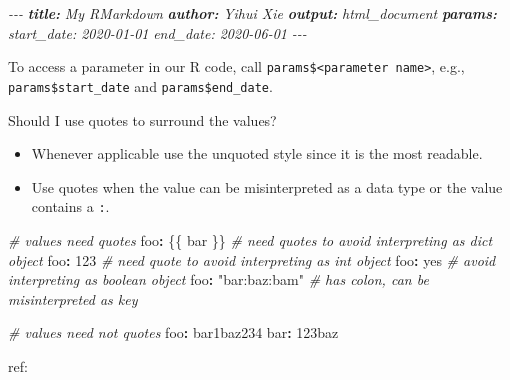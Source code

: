 \documentclass[
]{book}
\newenvironment{Shaded}{\begin{snugshade}}{\end{snugshade}}
\newcommand{\AnnotationTok}[1]{\textcolor[rgb]{0.56,0.35,0.01}{\textbf{\textit{#1}}}}
\newcommand{\CommentTok}[1]{\textcolor[rgb]{0.56,0.35,0.01}{\textit{#1}}}
\newcommand{\DecValTok}[1]{\textcolor[rgb]{0.00,0.00,0.81}{#1}}
\newcommand{\NormalTok}[1]{#1}
\newcommand{\SpecialCharTok}[1]{\textcolor[rgb]{0.81,0.36,0.00}{\textbf{#1}}}
\newcommand{\StringTok}[1]{\textcolor[rgb]{0.31,0.60,0.02}{#1}}
\providecommand{\tightlist}{%
  \setlength{\itemsep}{0pt}\setlength{\parskip}{0pt}}
\theoremstyle{definition}
\theoremstyle{definition}
\theoremstyle{definition}
\theoremstyle{definition}
\theoremstyle{remark}
\begin{document}
\begin{Shaded}
\begin{Highlighting}[]
\CommentTok{{-}{-}{-}}
\AnnotationTok{title:}\CommentTok{ My RMarkdown}
\AnnotationTok{author:}\CommentTok{ Yihui Xie}
\AnnotationTok{output:}\CommentTok{ html\_document}
\AnnotationTok{params:}
\CommentTok{  start\_date: \textquotesingle{}2020{-}01{-}01\textquotesingle{}}
\CommentTok{  end\_date: \textquotesingle{}2020{-}06{-}01\textquotesingle{}}
\CommentTok{{-}{-}{-}}
\end{Highlighting}
\end{Shaded}

To access a parameter in our R code, call \texttt{params\$\textless{}parameter\ name\textgreater{}}, e.g., \texttt{params\$start\_date} and \texttt{params\$end\_date}.

Should I use quotes to surround the values?

\begin{itemize}
\tightlist
\item
  Whenever applicable use the unquoted style since it is the most readable.
\item
  Use quotes when the value can be misinterpreted as a data type or the value contains a \texttt{:}.
\end{itemize}

\begin{Shaded}
\begin{Highlighting}[]
\CommentTok{\# values need quotes}
\NormalTok{foo}\SpecialCharTok{:} \StringTok{\textquotesingle{}\{\{ bar \}\}\textquotesingle{}} \CommentTok{\# need quotes to avoid interpreting as \textasciigrave{}dict\textasciigrave{} object}
\NormalTok{foo}\SpecialCharTok{:} \StringTok{\textquotesingle{}123\textquotesingle{}}       \CommentTok{\# need quote to avoid interpreting as \textasciigrave{}int\textasciigrave{} object}
\NormalTok{foo}\SpecialCharTok{:} \StringTok{\textquotesingle{}yes\textquotesingle{}}           \CommentTok{\# avoid interpreting as \textasciigrave{}boolean\textasciigrave{} object}
\NormalTok{foo}\SpecialCharTok{:} \StringTok{"bar:baz:bam"} \CommentTok{\# has colon, can be misinterpreted as key}

\CommentTok{\# values need not quotes}
\NormalTok{foo}\SpecialCharTok{:}\NormalTok{ bar1baz234}
\NormalTok{bar}\SpecialCharTok{:} \DecValTok{123}\NormalTok{baz}
\end{Highlighting}
\end{Shaded}

ref:
\end{document}
